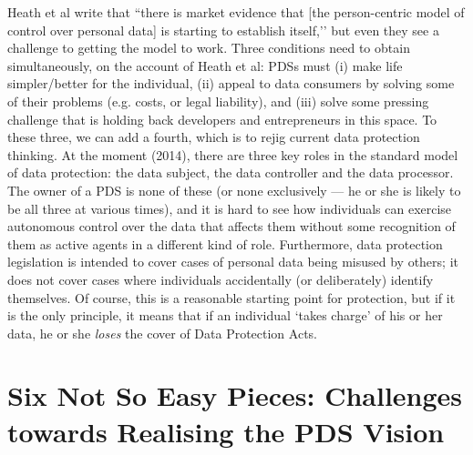 \documentclass{acm_proc_article-sp}
\begin{document}

Heath et al write \cite{heath2013} that ``there is market evidence that [the person-centric model of control over personal data] is starting to establish itself,’’ but even they see a challenge to getting the model to work. Three conditions need to obtain simultaneously, on the account of Heath et al: PDSs must (i) make life simpler/better for the individual, (ii) appeal to data consumers by solving some of their problems (e.g. costs, or legal liability), and (iii) solve some pressing challenge that is holding back developers and entrepreneurs in this space. To these three, we can add a fourth, which is to rejig current data protection thinking. At the moment (2014), there are three key roles in the standard model of data protection: the data subject, the data controller and the data processor. The owner of a PDS is none of these (or none exclusively --- he or she is likely to be all three at various times), and it is hard to see how individuals can exercise autonomous control over the data that affects them without some recognition of them as active agents in a different kind of role. Furthermore, data protection legislation is intended to cover cases of personal data being misused by others; it does not cover cases where individuals accidentally (or deliberately) identify themselves. Of course, this is a reasonable starting point for protection, but if it is the only principle, it means that if an individual `takes charge’ of his or her data, he or she {\em loses} the cover of Data Protection Acts.


\section{Six Not So Easy Pieces: Challenges towards Realising the PDS Vision}

\end{document}
